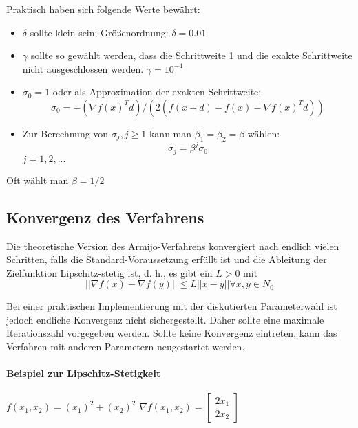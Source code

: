 Praktisch haben sich folgende Werte bewährt:
\begin{itemize}
\item $\delta$ sollte klein sein; Größenordnung: $\delta = 0.01$
\item$\gamma$ sollte so gewählt werden, dass die Schrittweite 1 und die exakte
Schrittweite nicht ausgeschlossen werden. $\gamma = 10^{-4}$
\item $\sigma_0 = 1$ oder als Approximation der exakten Schrittweite:
\begin{equation}
\sigma_0 = - (\nabla f(x)^T d) / (2 (f(x + d) - f(x) - \nabla f(x)^T d))
\end{equation}
\item Zur Berechnung von $\sigma_j,j \geq 1$ kann man $\beta_1 = \beta_2 = \beta$ wählen:
\begin{equation}
\sigma_j = \beta^j \sigma_0 
\end{equation}
$j = 1, 2, . . .$

\end{itemize}
Oft wählt man $\beta = 1/2$

\subsection{Konvergenz des Verfahrens}

Die theoretische Version des Armijo-Verfahrens konvergiert nach endlich
vielen Schritten, falls die Standard-Voraussetzung erfüllt ist und die
Ableitung der Zielfunktion Lipschitz-stetig ist, d. h., es gibt ein $L > 0$ mit
\begin{equation}
|| \nabla f(x) - \nabla f(y)|| \leq L ||x - y|| \forall x,y \in N_0
\end{equation}

Bei einer praktischen Implementierung mit der diskutierten
Parameterwahl ist jedoch endliche Konvergenz nicht sichergestellt.
Daher sollte eine maximale Iterationszahl vorgegeben werden. Sollte
keine Konvergenz eintreten, kann das Verfahren mit anderen Parametern
neugestartet werden.

\paragraph{Beispiel zur Lipschitz-Stetigkeit}

$f(x_1,x_2) = (x_1)^2 + (x_2)^2 $
$\nabla f(x_1,x_2) = \begin{bmatrix}2x_1\\2x_2\end{bmatrix}$

